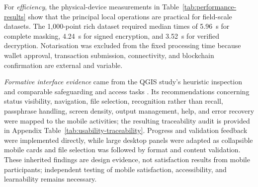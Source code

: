 \documentclass[]{interact}
\begin{document}
For \textit{efficiency}, the physical-device measurements in Table~\ref{tab:performance-results} show that the principal local operations are practical for field-scale datasets. The 1,000-point rich dataset required median times of 5.96~s for complete masking, 4.24~s for signed encryption, and 3.52~s for verified decryption. Notarisation was excluded from the fixed processing time because wallet approval, transaction submission, connectivity, and blockchain confirmation are external and variable.

\textit{Formative interface evidence} came from the QGIS study's heuristic inspection and comparable safeguarding and access tasks \citep{nielsen1995conduct}. Its recommendations concerning status visibility, navigation, file selection, recognition rather than recall, passphrase handling, screen density, output management, help, and error recovery were mapped to the mobile activities; the resulting traceability audit is provided in Appendix Table~\ref{tab:usability-traceability}. Progress and validation feedback were implemented directly, while large desktop panels were adapted as collapsible mobile cards and file selection was followed by format and content validation. These inherited findings are design evidence, not satisfaction results from mobile participants; independent testing of mobile satisfaction, accessibility, and learnability remains necessary.

\end{document}
